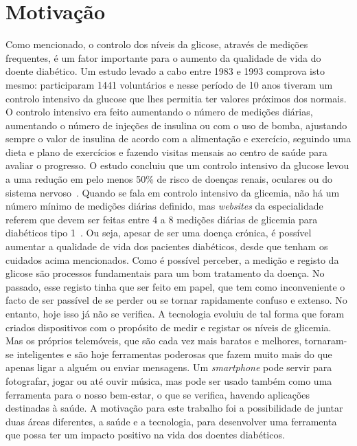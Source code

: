 \section{Motivação}

Como mencionado, o controlo dos níveis da glicose, através de medições frequentes, é um fator importante para o aumento da qualidade de vida do doente diabético. Um estudo levado a cabo entre 1983 e 1993 comprova isto mesmo: participaram 1441 voluntários e nesse período de 10 anos tiveram um controlo intensivo da glucose que lhes permitia ter valores próximos dos normais. O controlo intensivo era feito aumentando o número de medições diárias, aumentando o número de injeções de insulina ou com o uso de bomba, ajustando sempre o valor de insulina de acordo com a alimentação e exercício, seguindo uma dieta e plano de exercícios e fazendo visitas mensais ao centro de saúde para avaliar o progresso. O estudo concluiu que um controlo intensivo da glucose levou a uma redução em pelo menos 50\% de risco de doenças renais, oculares ou do sistema nervoso~\cite{edit}. Quando se fala em controlo intensivo da glicemia, não há um número mínimo de medições diárias definido, mas \textit{websites} da especialidade referem que devem ser feitas entre 4 a 8 medições diárias de glicemia para diabéticos tipo 1~\cite{measures1, measures2}.
Ou seja, apesar de ser uma doença crónica, é possível aumentar a qualidade de vida dos pacientes diabéticos, desde que tenham os cuidados acima mencionados. 
Como é possível perceber, a medição e registo da glicose são processos fundamentais para um bom tratamento da doença. No passado, esse registo tinha que ser feito em papel, que tem como inconveniente o facto de ser passível de se perder ou se tornar rapidamente confuso e extenso. No entanto, hoje isso já não se verifica.
A tecnologia evoluiu de tal forma que foram criados dispositivos com o propósito de medir e registar os níveis de glicemia. Mas os próprios telemóveis, que são cada vez mais baratos e melhores, tornaram-se inteligentes e são hoje ferramentas poderosas que fazem muito mais do que apenas ligar a alguém ou enviar mensagens. 
Um \textit{smartphone} pode servir para fotografar, jogar ou até ouvir música, mas pode ser usado também como uma ferramenta para o nosso bem-estar, o que se verifica, havendo aplicações destinadas à saúde. A motivação para este trabalho foi a possibilidade de juntar duas áreas diferentes, a saúde e a tecnologia, para desenvolver uma ferramenta que possa ter um impacto positivo na vida dos doentes diabéticos. 


